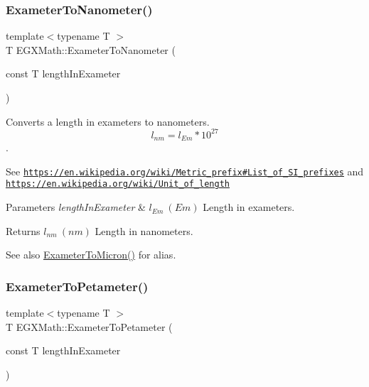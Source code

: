 \subsubsection{\texorpdfstring{Exameter\+To\+Nanometer()}{ExameterToNanometer()}}
{\footnotesize\ttfamily template$<$typename T $>$ \\
T E\+G\+X\+Math\+::\+Exameter\+To\+Nanometer (\begin{DoxyParamCaption}\item[{const T}]{length\+In\+Exameter }\end{DoxyParamCaption})}



Converts a length in exameters to nanometers. \[ l_{nm}=l_{Em} * 10^{27} \]. 

See \href{https://en.wikipedia.org/wiki/Metric_prefix#List_of_SI_prefixes}{\tt https\+://en.\+wikipedia.\+org/wiki/\+Metric\+\_\+prefix\#\+List\+\_\+of\+\_\+\+S\+I\+\_\+prefixes} and \href{https://en.wikipedia.org/wiki/Unit_of_length}{\tt https\+://en.\+wikipedia.\+org/wiki/\+Unit\+\_\+of\+\_\+length} 
\begin{DoxyParams}{Parameters}
{\em length\+In\+Exameter} & $ l_{Em}\ (Em)$ Length in exameters. \\
\hline
\end{DoxyParams}
\begin{DoxyReturn}{Returns}
$ l_{nm}\ (nm)$ Length in nanometers. 
\end{DoxyReturn}
\begin{DoxySeeAlso}{See also}
\mbox{\hyperlink{group___e_g_x_math-_conversions-_length_conversions-_s_i-_exameter-_non-_s_i_ga3356bb6585e02757a196b299c29660c1}{Exameter\+To\+Micron()}} for alias. 
\end{DoxySeeAlso}
\mbox{\label{group___e_g_x_math-_conversions-_length_conversions-_s_i-_exameter-_s_i_gadf7ed11d79b89826a108cd01e4f67769}} 
\subsubsection{\texorpdfstring{Exameter\+To\+Petameter()}{ExameterToPetameter()}}
{\footnotesize\ttfamily template$<$typename T $>$ \\
T E\+G\+X\+Math\+::\+Exameter\+To\+Petameter (\begin{DoxyParamCaption}\item[{const T}]{length\+In\+Exameter }\end{DoxyParamCaption})}



